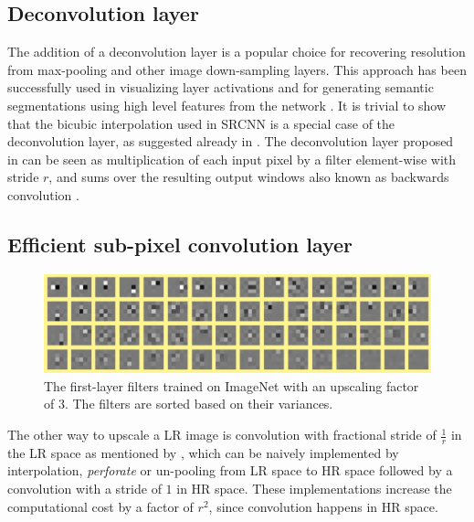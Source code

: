 \documentclass[10pt,twocolumn,letterpaper]{article}
\begin{document}
\subsection{Deconvolution layer}

The addition of a deconvolution layer is a popular choice for recovering resolution from max-pooling and other image down-sampling layers. This approach has been successfully used in visualizing layer activations \cite{zeiler2014visualizing} and for generating semantic segmentations using high level features from the network \cite{long2014fully}. It is trivial to show that the bicubic interpolation used in SRCNN is a special case of the deconvolution layer, as suggested already in \cite{long2014fully,dong2015image}. The deconvolution layer proposed in \cite{zeiler2011adaptive} can be seen as multiplication of each input pixel by a filter element-wise with stride $r$, and sums over the resulting output windows also known as backwards convolution \cite{long2014fully}.

\subsection{Efficient sub-pixel convolution layer}
\label{subsec:subpixelconvolutionlayer}

\begin{figure}[htbp]
\begin{center}
\includegraphics[width=\linewidth]{figures//firstLayerWeights.jpg}
\caption{The first-layer filters trained on ImageNet with an upscaling factor of 3. The filters are sorted based on their variances.}
\label{fig:firstlayerweights}
\end{center}
\end{figure}

The other way to upscale a \ac{LR} image is convolution with fractional stride of $\frac{1}{r}$ in the \ac{LR} space as mentioned by \cite{long2014fully}, which can be naively implemented by interpolation, {\em perforate} \cite{osendorfer2014image} or un-pooling \cite{zeiler2014visualizing} from \ac{LR} space to \ac{HR} space followed by a convolution with a stride of $1$ in \ac{HR} space. These implementations increase the computational cost by a factor of $r^2$, since convolution happens in \ac{HR} space.
\end{document}
